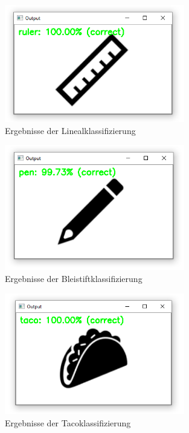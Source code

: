 \begin{figure}[H]
  \includegraphics[width=0.7\textwidth]{img/piktogrammerkennung/classifiedRuler.PNG}
  \centering
  \caption{Ergebnisse der Linealklassifizierung}
\end{figure}
   
\begin{figure}[H]
  \includegraphics[width=0.7\textwidth]{img/piktogrammerkennung/classifiedPen.PNG}
  \centering
  \caption{Ergebnisse der Bleistiftklassifizierung}
\end{figure}
   
\begin{figure}[H]
  \includegraphics[width=0.7\textwidth]{img/piktogrammerkennung/classifiedTaco.PNG}
  \centering
  \caption{Ergebnisse der Tacoklassifizierung}
\end{figure}
   

